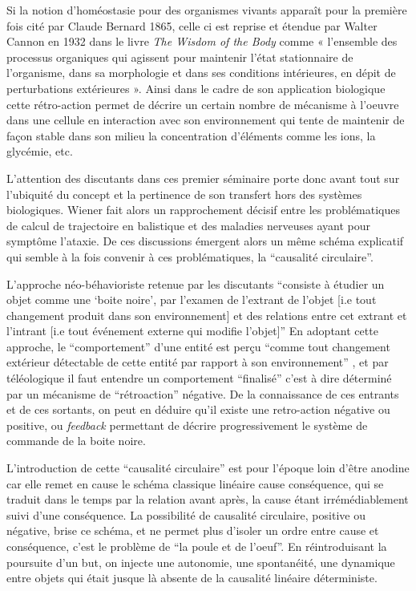 Si la notion d'homéostasie pour des organismes vivants apparaît pour la première fois cité par Claude Bernard 1865, celle ci est reprise et étendue par Walter Cannon en 1932 dans le livre \textit{The Wisdom of the Body} \autocite{Cannon1932} comme « l’ensemble des processus organiques qui agissent pour maintenir l’état stationnaire de l’organisme, dans sa morphologie et dans ses conditions intérieures, en dépit de perturbations extérieures ». Ainsi dans le cadre de son application biologique cette rétro-action permet de décrire un certain nombre de mécanisme à l'oeuvre dans une cellule en interaction avec son environnement qui tente de maintenir de façon stable dans son milieu la concentration d'éléments comme les ions, la glycémie, etc.

L'attention des discutants dans ces premier séminaire porte donc avant tout sur l'ubiquité du concept et la pertinence de son transfert hors des systèmes biologiques. Wiener fait alors un rapprochement décisif entre les problématiques de calcul de trajectoire en balistique et des maladies nerveuses ayant pour symptôme l'ataxie. De ces discussions émergent alors un même schéma explicatif qui semble à la fois convenir à ces problématiques, la \enquote{causalité circulaire}. \autocite[774]{Pouvreau2013, Rosnay1975}

L'approche néo-béhavioriste retenue par les discutants \enquote{consiste à étudier un objet comme une \enquote{boite noire}, par l'examen de l'extrant de l'objet [i.e tout changement produit dans son environnement] et des relations entre cet extrant et l'intrant [i.e tout événement externe qui modifie l'objet]} \autocite{Pouvreau2013} En adoptant cette approche, le \enquote{comportement} d'une entité est perçu \enquote{comme tout changement extérieur détectable de cette entité par rapport à son environnement} , et par téléologique il faut entendre un comportement \enquote{finalisé} c'est à dire déterminé par un mécanisme de \enquote{rétroaction} négative. De la connaissance de ces entrants et de ces sortants, on peut en déduire qu'il existe une retro-action négative ou positive, ou \textit{feedback} permettant de décrire progressivement le système de commande de la boite noire.

L'introduction de cette \enquote{causalité circulaire} est pour l'époque loin d'être anodine car elle remet en cause le schéma classique linéaire cause \textrightarrow conséquence, qui se traduit dans le temps par la relation avant \textrightarrow après, la cause étant irrémédiablement suivi d'une conséquence. La possibilité de causalité circulaire, positive ou négative, brise ce schéma, et ne permet plus d'isoler un ordre entre cause et conséquence, c'est le problème de \enquote{la poule et de l'oeuf}. En réintroduisant la poursuite d'un but, on injecte une autonomie, une spontanéité, une dynamique entre objets qui était jusque là absente de la causalité linéaire déterministe.

